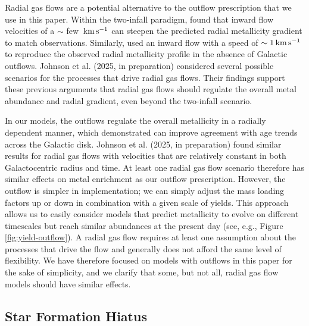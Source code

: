 \documentclass[twocolumn,twocolappendix,linenumbers]{aastex631}
\newcommand{\kms}{\,{\rm km}\,{\rm s}^{-1}}
\begin{document}
Radial gas flows are a potential alternative to the outflow prescription that we use in this paper. Within the two-infall paradigm, \citet{spitoni_effects_2011} found that inward flow velocities of a $\sim$ few $\kms$ can steepen the predicted radial metallicity gradient to match observations. Similarly, \citet{palla_chemical_2020,palla_mapping_2024} used an inward flow with a speed of $\sim1\kms$ to reproduce the observed radial metallicity profile in the absence of Galactic outflows. Johnson et al. (2025, in preparation) considered several possible scenarios for the processes that drive radial gas flows. Their findings support these previous arguments that radial gas flows should regulate the overall metal abundance and radial gradient, even beyond the two-infall scenario.

In our models, the outflows regulate the overall metallicity in a radially dependent manner, which \citet{johnson_milky_2024} demonstrated can improve agreement with age trends across the Galactic disk. Johnson et al. (2025, in preparation) found similar results for radial gas flows with velocities that are relatively constant in both Galactocentric radius and time. At least one radial gas flow scenario therefore has similar effects on metal enrichment as our outflow prescription. However, the outflow is simpler in implementation; we can simply adjust the mass loading factors up or down in combination with a given scale of yields. This approach allows us to easily consider models that predict metallicity to evolve on different timescales but reach similar abundances at the present day (see, e.g., Figure \ref{fig:yield-outflow}). A radial gas flow requires at least one assumption about the processes that drive the flow and generally does not afford the same level of flexibility. We have therefore focused on models with outflows in this paper for the sake of simplicity, and we clarify that some, but not all, radial gas flow models should have similar effects.

\subsection{Star Formation Hiatus}
\label{sec:sfe-hiatus}
\end{document}
